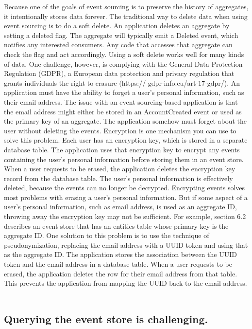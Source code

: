 Because one of the goals of event sourcing is to preserve the history of aggregates, it
intentionally stores data forever. The traditional way to delete data when using event
sourcing is to do a soft delete. An application deletes an aggregate by setting a
deleted flag. The aggregate will typically emit a Deleted event, which notifies any
interested consumers. Any code that accesses that aggregate can check the flag and
act accordingly.
 Using a soft delete works well for many kinds of data. One challenge, however, is
complying with the General Data Protection Regulation (GDPR), a European data
protection and privacy regulation that grants individuals the right to erasure (https://
gdpr-info.eu/art-17-gdpr/). An application must have the ability to forget a user’s personal information, such as their email address. The issue with an event sourcing-based
application is that the email address might either be stored in an AccountCreated
event or used as the primary key of an aggregate. The application somehow must forget about the user without deleting the events.
 Encryption is one mechanism you can use to solve this problem. Each user has an
encryption key, which is stored in a separate database table. The application uses that
encryption key to encrypt any events containing the user’s personal information
before storing them in an event store. When a user requests to be erased, the application deletes the encryption key record from the database table. The user’s personal
information is effectively deleted, because the events can no longer be decrypted.
 Encrypting events solves most problems with erasing a user’s personal information.
But if some aspect of a user’s personal information, such as email address, is used as
an aggregate ID, throwing away the encryption key may not be sufficient. For example, section 6.2 describes an event store that has an entities table whose primary key
is the aggregate ID. One solution to this problem is to use the technique of pseudonymization, replacing the email address with a UUID token and using that as the
aggregate ID. The application stores the association between the UUID token and the
email address in a database table. When a user requests to be erased, the application
deletes the row for their email address from that table. This prevents the application
from mapping the UUID back to the email address. ~\citep{richardson2018microservices}

\subsection{Querying the event store is challenging.}

